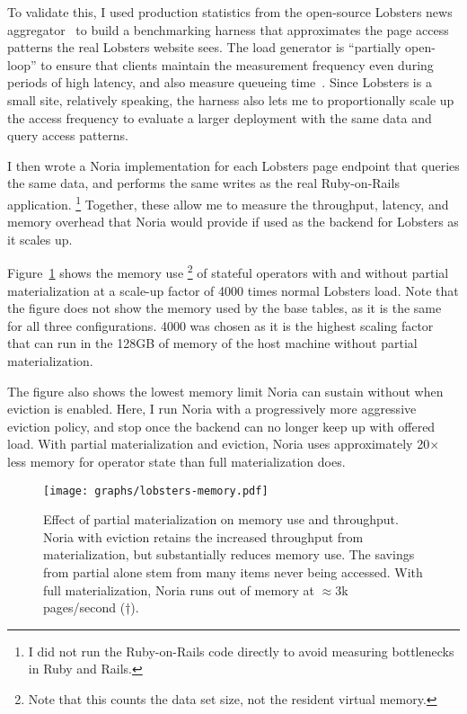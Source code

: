 To validate this, I used production statistics from the open-source Lobsters
news aggregator~\cite{lobsters,lobsters-data} to build a benchmarking harness
that approximates the page access patterns the real Lobsters website sees. The
load generator is ``partially open-loop'' to ensure that clients maintain the
measurement frequency even during periods of high latency, and also measure
queueing time~\cite{frank-open-loop,open-loop-cautionary-tale}. Since Lobsters
is a small site, relatively speaking, the harness also lets me to proportionally
scale up the access frequency to evaluate a larger deployment with the same
data and query access patterns.

I then wrote a Noria implementation for each Lobsters page endpoint that
queries the same data, and performs the same writes as the real Ruby-on-Rails
application.%
\footnote{I did not run the Ruby-on-Rails code directly to avoid measuring
bottlenecks in Ruby and Rails.}
Together, these allow me to measure the throughput, latency, and memory overhead
that Noria would provide if used as the backend for Lobsters as it scales up.

Figure~\ref{f:lobsters-memory} shows the memory use%
\footnote{Note that this counts the data set size, not the resident virtual
memory.}
of stateful operators with
and without partial materialization at a scale-up factor of 4000 times normal
Lobsters load. Note that the figure does not show the memory used by the base
tables, as it is the same for all three configurations. 4000 was chosen as it is
the highest scaling factor that can run in the 128GB of memory of the host
machine without partial materialization.

The figure also shows the lowest memory limit Noria can sustain without when
eviction is enabled. Here, I run Noria with a progressively more aggressive
eviction policy, and stop once the backend can no longer keep up with offered
load. With partial materialization and eviction, Noria uses approximately
20$\times$ less memory for operator state than full materialization does.

\begin{figure}[ht]
  \centering
  \texttt{[image: graphs/lobsters-memory.pdf]}
  \caption{Effect of partial materialization on memory use and throughput. Noria
  with eviction retains the increased throughput from materialization, but
  substantially reduces memory use. The savings from partial alone stem from
  many items never being accessed. With full materialization, Noria runs out of
  memory at $\approx$3k pages/second (†).}
  \label{f:lobsters-memory}
\end{figure}

